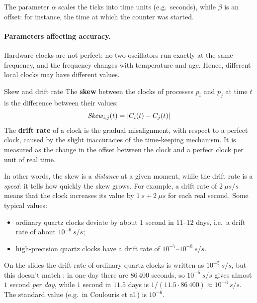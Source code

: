 The parameter $\alpha$ scales the ticks into time units (e.g.\ seconds), while $\beta$ is an offset: for instance, the time at which the counter was started.

\paragraph{Parameters affecting accuracy.} Hardware clocks are not perfect: no two oscillators run exactly at the same frequency, and the frequency changes with temperature and age. Hence, different local clocks may have different values.

\begin{frameddefn}{Skew and drift rate}
  The \textbf{skew} between the clocks of processes $p_i$ and $p_j$ at time $t$ is the difference between their values:
  \[\mathit{Skew}_{i,j}(t) = \left\lvert C_i(t) - C_j(t)\right\rvert\]
  The \textbf{drift rate} of a clock is the gradual misalignment, with respect to a perfect clock, caused by the slight inaccuracies of the time-keeping mechanism. It is measured as the change in the offset between the clock and a perfect clock per unit of real time.
\end{frameddefn}

In other words, the skew is a \textit{distance} at a given moment, while the drift rate is a \textit{speed}: it tells how quickly the skew grows. For example, a drift rate of $2\ \mu s/s$ means that the clock increases its value by $1\ s + 2\ \mu s$ for each real second. Some typical values:
\begin{itemize}
  \item ordinary quartz clocks deviate by about $1$ second in $11$--$12$ days, i.e.\ a drift rate of about $10^{-6}\ s/s$;
  \item high-precision quartz clocks have a drift rate of $10^{-7}$--$10^{-8}\ s/s$.
\end{itemize}

\begin{framedobs}{}
  On the slides the drift rate of ordinary quartz clocks is written as $10^{-5}\ s/s$, but this doesn't match : in one day there are $86\,400$ seconds, so $10^{-5}\ s/s$ gives almost $1$ second \textit{per day}, while $1$ second in $11.5$ days is $1 / (11.5 \cdot 86\,400) \approx 10^{-6}\ s/s$. The standard value (e.g.\ in Coulouris et al.) is $10^{-6}$.
\end{framedobs}

